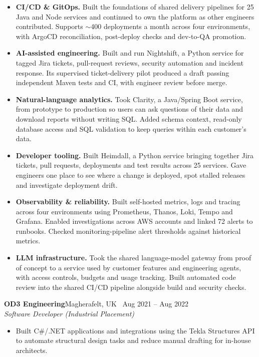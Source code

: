 \documentclass[a4paper,10pt]{article}
\newcommand{\role}[4]{%
  \par\vspace{4pt}\noindent
  {\bfseries #1}\hfill\textcolor{muted}{#3 \textperiodcentered\ #4}\\[1pt]
  \textit{#2}\par
  \vspace{2pt}
}
\newcommand{\lead}[1]{\textcolor{accent}{\textbf{#1}}}
\begin{document}
\begin{itemize}
  \item \lead{CI/CD \& GitOps.} Built the foundations of shared delivery pipelines for 25 Java and Node services and continued to own the platform as other engineers contributed. Supports $\sim$400 deployments a month across four environments, with ArgoCD reconciliation, post-deploy checks and dev-to-QA promotion.
  \item \lead{AI-assisted engineering.} Built and run Nightshift, a Python service for tagged Jira tickets, pull-request reviews, security automation and incident response. Its supervised ticket-delivery pilot produced a draft passing independent Maven tests and CI, with engineer review before merge.
  \item \lead{Natural-language analytics.} Took Clarity, a Java/Spring Boot service, from prototype to production so users can ask questions of their data and download reports without writing SQL. Added schema context, read-only database access and SQL validation to keep queries within each customer's data.
  \item \lead{Developer tooling.} Built Heimdall, a Python service bringing together Jira tickets, pull requests, deployments and test results across 25 services. Gave engineers one place to see where a change is deployed, spot stalled releases and investigate deployment drift.
  \item \lead{Observability \& reliability.} Built self-hosted metrics, logs and tracing across four environments using Prometheus, Thanos, Loki, Tempo and Grafana. Enabled investigations across AWS accounts and linked 72 alerts to runbooks. Checked monitoring-pipeline alert thresholds against historical metrics.
  \item \lead{LLM infrastructure.} Took the shared language-model gateway from proof of concept to a service used by customer features and engineering agents, with access controls, budgets and usage tracking. Built automated code review into the shared CI/CD pipeline alongside build and security checks.
\end{itemize}

\role{OD3 Engineering}{Software Developer (Industrial Placement)}{Magherafelt, UK}{Aug 2021 -- Aug 2022}
\begin{itemize}
  \item Built C\#/.NET applications and integrations using the Tekla Structures API to automate structural design tasks and reduce manual drafting for in-house architects.
\end{itemize}
\end{document}

